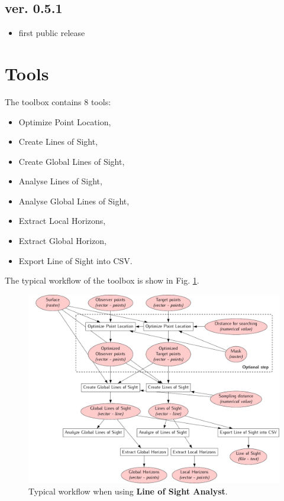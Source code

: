 \documentclass[]{article}
\begin{document}
\subsection*{ver. 0.5.1}
\begin{itemize}
	\item first public release
\end{itemize}

\section{Tools}

The toolbox contains 8 tools:
\begin{itemize}
	\item Optimize Point Location,
	\item Create Lines of Sight,
	\item Create Global Lines of Sight,
	\item Analyse Lines of Sight,
	\item Analyse Global Lines of Sight,
	\item Extract Local Horizons,
	\item Extract Global Horizon,
	\item Export Line of Sight into CSV.
\end{itemize}
The typical workflow of the toolbox is show in Fig. \ref{Fig:Workflow}.

\begin{figure}
	\centering
	\includegraphics[width=\textwidth]{./images/workflow.pdf}
	\caption {Typical workflow when using \textbf{Line of Sight Analyst}.}
	\label{Fig:Workflow}
\end{figure} 
\end{document}
